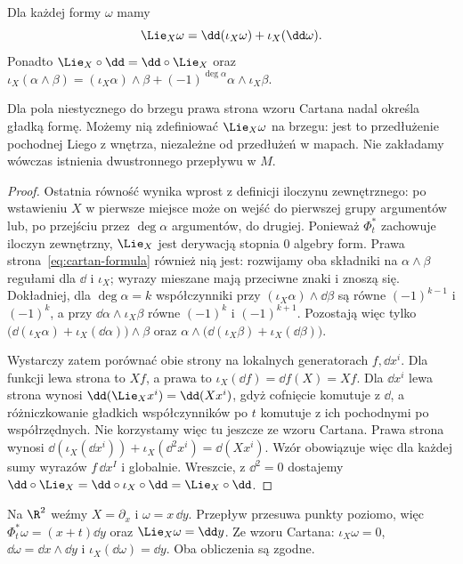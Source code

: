 \begin{twierdzenie}
\label{thm:cartan-formy}
Dla każdej formy $\omega$ mamy
\begin{equation}\label{eq:cartan-formula}
 \Lie_X\omega=\dd(\iota_X\omega)
       +\iota_X(\dd\omega).
\end{equation}
Ponadto $\Lie_X\circ\dd=\dd\circ\Lie_X$ oraz
$\iota_X(\alpha\wedge\beta)=
(\iota_X\alpha)\wedge\beta
+(-1)^{\deg\alpha}\alpha\wedge\iota_X\beta$.
\end{twierdzenie}
Dla pola niestycznego do brzegu prawa strona wzoru Cartana
nadal określa gładką formę. Możemy nią zdefiniować
$\Lie_X\omega$ na brzegu: jest to przedłużenie pochodnej
Liego z wnętrza, niezależne od przedłużeń w mapach.
Nie zakładamy wówczas istnienia dwustronnego przepływu w $M$.
\begin{proof}
Ostatnia równość wynika wprost z definicji iloczynu
zewnętrznego: po wstawieniu $X$ w pierwsze miejsce
może on wejść do pierwszej grupy argumentów lub,
po przejściu przez $\deg\alpha$ argumentów, do drugiej.
Ponieważ $\Phi_t^*$ zachowuje iloczyn zewnętrzny,
$\Lie_X$ jest derywacją stopnia $0$ algebry form.
Prawa strona~\eqref{eq:cartan-formula} również nią jest:
rozwijamy oba składniki na $\alpha\wedge\beta$
regułami dla $\dd$ i $\iota_X$; wyrazy mieszane mają
przeciwne znaki i znoszą się. Dokładniej, dla $\deg\alpha=k$
współczynniki przy $(\iota_X\alpha)\wedge\dd\beta$ są równe
$(-1)^{k-1}$ i $(-1)^k$, a przy
$\dd\alpha\wedge\iota_X\beta$ równe $(-1)^k$ i $(-1)^{k+1}$.
Pozostają więc tylko
$\bigl(\dd(\iota_X\alpha)+\iota_X(\dd\alpha)\bigr)\wedge\beta$
oraz $\alpha\wedge\bigl(\dd(\iota_X\beta)+\iota_X(\dd\beta)\bigr)$.

Wystarczy zatem porównać obie strony na lokalnych
generatorach $f,\dd x^i$. Dla funkcji lewa strona to
$Xf$, a prawa to $\iota_X(\dd f)=\dd f(X)=Xf$.
Dla $\dd x^i$ lewa strona wynosi
$\dd(\Lie_Xx^i)=\dd(Xx^i)$, gdyż cofnięcie
komutuje z $\dd$, a różniczkowanie gładkich współczynników
po $t$ komutuje z ich pochodnymi po współrzędnych.
Nie korzystamy więc tu jeszcze ze wzoru Cartana.
Prawa strona wynosi
$\dd(\iota_X(\dd x^i))+\iota_X(\dd^2x^i)
=\dd(Xx^i)$. Wzór obowiązuje więc dla
każdej sumy wyrazów $f\,\dd x^I$ i globalnie.
Wreszcie, z $\dd^2=0$ dostajemy
$\dd\circ\Lie_X=\dd\circ\iota_X\circ\dd
=\Lie_X\circ\dd$.
\end{proof}

\begin{przyklad}
Na $\R^2$ weźmy $X=\partial_x$ i $\omega=x\,\dd y$.
Przepływ przesuwa punkty poziomo, więc
$\Phi_t^*\omega=(x+t)\dd y$ oraz
$\Lie_X\omega=\dd y$. Ze wzoru Cartana:
$\iota_X\omega=0$, $\dd\omega=\dd x\wedge\dd y$
i $\iota_X(\dd\omega)=\dd y$. Oba obliczenia są zgodne.
\end{przyklad}
